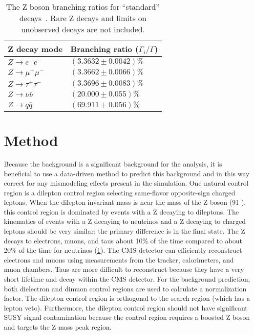 \begin{table}
\begin{center}
\caption[The Z boson branching ratios for ``standard'' decays]
{
    The Z boson branching ratios for ``standard'' decays~\cite{PDG2018}.
    Rare Z decays and limits on unobserved decays are not included.
}
\label{tab:Zbranching}
\begin{tabular}{ll}
\hline
Z decay mode & Branching ratio ($\Gamma_{i}/\Gamma$)\\
\hline
$Z \to e^{+}e^{-}$        & $\left(  3.3632 \pm 0.0042 \right)\%$\\
$Z \to \mu^{+}\mu^{-}$    & $\left(  3.3662 \pm 0.0066 \right)\%$\\
$Z \to \tau^{+}\tau^{-}$  & $\left(  3.3696 \pm 0.0083 \right)\%$\\
$Z \to \nu\bar{\nu}$      & $\left( 20.000  \pm 0.055  \right)\%$\\
$Z \to q\bar{q}$          & $\left( 69.911  \pm 0.056  \right)\%$\\
\hline
\end{tabular}
\end{center}
\end{table}

\section{Method}
\label{sec:zinvisible-method}

Because the \zinv background is a significant background for the analysis, it is beneficial to use a data-driven method to predict this background and in this way correct for any mismodeling effects present in the \znunu simulation.
One natural control region is a dilepton control region selecting same-flavor opposite-sign charged leptons.
When the dilepton invariant mass is near the mass of the Z boson (91 \GeV), this control region is dominated by events with a Z decaying to dileptons.
The kinematics of events with a Z decaying to neutrinos and a Z decaying to charged leptons should be very similar; the primary difference is in the final state.
The Z decays to electrons, muons, and taus about 10\% of the time compared to about 20\% of the time for neutrinos (\cref{tab:Zbranching}).
The CMS detector can efficiently reconstruct electrons and muons using measurements from the tracker, calorimeters, and muon chambers.
Taus are more difficult to reconstruct because they have a very short lifetime and decay within the CMS detector.
For the \zinv background prediction, both dielectron and dimuon control regions are used to calculate a normalization factor.
The dilepton control region is orthogonal to the search region (which has a lepton veto).
Furthermore, the dilepton control region should not have significant SUSY signal contamination because the control region requires a boosted Z boson and targets the Z mass peak region.

